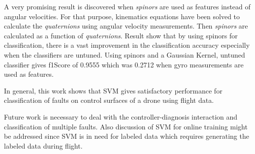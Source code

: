 A very promising result is discovered when \emph{spinors} are used as features instead of angular velocities. 
For that purpose, kinematics equations have been solved to calculate the \emph{quaternions} using angular velocity measurements. Then \emph{spinors} are calculated as a function of \emph{quaternions}. Result show that by using spinors for classification, there is a vast improvement in the classification accuracy especially when the classifiers are untuned. Using spinors and a Gaussian Kernel, untuned classifier gives f1Score of 0.9555 which was 0.2712 when gyro measurements are used as features.

In general, this work shows that SVM gives satisfactory performance for classification of faults on control surfaces of a drone using flight data.

Future work is necessary to deal with the controller-diagnosis interaction and classification of multiple faults. Also discussion of SVM for online training might be addressed since SVM is in need for labeled data which requires generating the labeled data during flight. 
